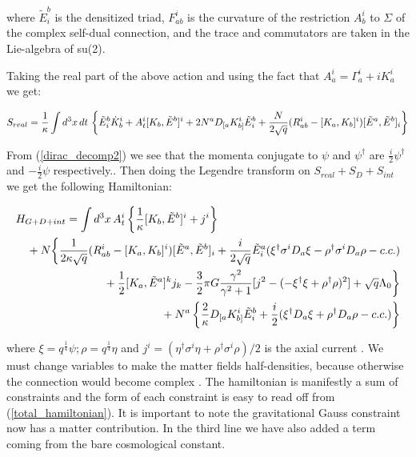 \begin{doublespace}
where $\tilde{E}^b_i$ is the densitized triad, $F_{ab}^i$ is the curvature of the restriction
$A_b^i$ to $\Sigma$ of the complex self-dual connection, and the trace and commutators are taken in
the Lie-algebra of su(2).

Taking the real part of the above action and using the fact that $A_a^i = \Gamma_a^i + iK_a^i$ we
get:

\begin{equation}\label{real_gravitational_action}
    S_{real} = \frac{1}{\kappa}\int
    d^3x\,dt\,\left\{\tilde{E}^b_i \dot{K}^i_b + A^i_t[K_b,\tilde{E}^b]^i
    + 2 N^a D_{[a}K_{b]}^i\tilde{E}^b_i \\
    + \frac{N}{2\sqrt{q}}(R_{ab}^i -[K_a,K_b]^i)[\tilde{E}^a,\tilde{E}^b]_i
    \right\}
\end{equation}

From (\ref{dirac_decomp2}) we see that the momenta conjugate to $\psi$ and $\psi^\dag$ are
$\frac{i}{2}\psi^\dag$ and $-\frac{i}{2}\psi$ respectively.. Then doing the Legendre transform on
$S_{real} + S_D + S_{int}$ we get the following Hamiltonian:

\begin{eqnarray}\label{total_hamiltonian}
    \lefteqn{H_{G+D+int}  =  \int d^{3}x\, A_t^{i}\left\{\frac{1}{\kappa}[K_b,\tilde{E}^b]^i + j^i \right\}}\nonumber \\
     & &{}+N\bigg\{\frac{1}{2\kappa\sqrt{q}}(R_{ab}^i-[K_a,K_b]^i)[\tilde{E}^a,\tilde{E}^b]_i
     +\frac{i}{2\sqrt{q}}\tilde{E}^a_i(\xi^\dag\sigma^i D_a\xi - \rho^\dag\sigma^i D_a\rho - c.c.)\nonumber \\
     & &{}+\frac{1}{2}[K_a,\tilde{E}^a]^k j_k
     - \frac{3}{2} \pi G \frac{\gamma^{2}}{\gamma^{2}+1}[j^2 - (-\xi^\dag\xi + \rho^\dag\rho)^2] + \sqrt{q}\Lambda_0\bigg\} \nonumber \\
     & &{}+N^a\left\{\frac{2}{\kappa}D_{[a}K_{b]}^i\tilde{E}^b_i +
    \frac{i}{2}(\xi^\dag D_a\xi + \rho^\dag D_a\rho - c.c.)\right\}
\end{eqnarray}

where $\xi=q^\frac{1}{4}\psi; \rho=q^\frac{1}{4}\eta$ and $j^i = (\eta^\dag\sigma^i\eta +
\rho^\dag\sigma^i\rho)/2$ is the axial current . We must change variables to make the matter fields
half-densities, because otherwise the connection would become complex \cite{Thiemann1998Quantum}. The
hamiltonian is manifestly a sum of constraints and the form of each constraint is easy to read off
from (\ref{total_hamiltonian}). It is important to note the gravitational Gauss constraint now has
a matter contribution. In the third line we have also added a term coming from the bare
cosmological constant.


\end{doublespace}
